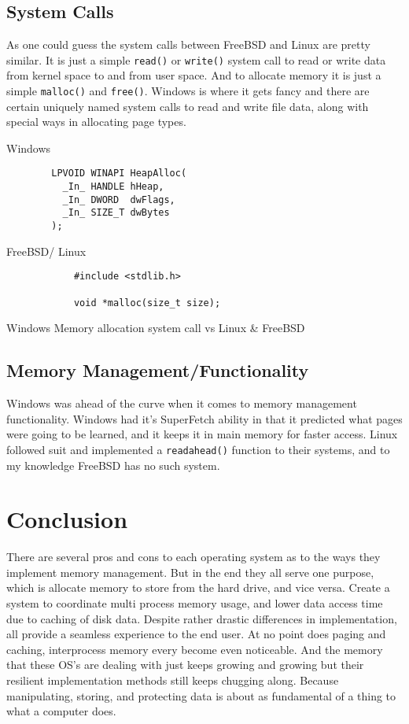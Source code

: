\documentclass{article}
\begin{document}
\subsection{System Calls}

		As one could guess the system calls between FreeBSD and Linux are pretty similar. It is just a simple \texttt{read()} or \texttt{write()} system call to read or write data from kernel space to and from user space. And to allocate memory it is just a simple \texttt{malloc()} and \texttt{free()}. Windows is where it gets fancy and there are certain uniquely named system calls to read and write file data, along with special ways in allocating page types.

		Windows
		\begin{lstlisting}
		LPVOID WINAPI HeapAlloc(
          _In_ HANDLE hHeap,
          _In_ DWORD  dwFlags,
          _In_ SIZE_T dwBytes
        );
		\end{lstlisting}
		 FreeBSD/ Linux
		\begin{lstlisting}
            #include <stdlib.h>

            void *malloc(size_t size);
        \end{lstlisting}

        Windows Memory allocation system call vs Linux \& FreeBSD
\subsection{Memory Management/Functionality}
		Windows was ahead of the curve when it comes to memory management functionality. Windows had it’s SuperFetch ability in that it predicted what pages were going to be learned, and it keeps it in main memory for faster access. Linux followed suit and implemented a \texttt{readahead()} function to their systems, and to my knowledge FreeBSD has no such system.

\section{Conclusion}
	There are several pros and cons to each operating system as to the ways they implement memory management. But in the end they all serve one purpose, which is allocate memory to store from the hard drive, and vice versa. Create a system to coordinate multi process memory usage, and lower data access time due to caching of disk data. Despite rather drastic differences in implementation, all provide a seamless experience to the end user. At no point does paging and caching, interprocess memory every become even noticeable. And the memory that these OS’s are dealing with just keeps growing and growing but their resilient implementation methods still keeps chugging along. Because manipulating, storing, and protecting data is about as fundamental of a thing to what a computer does.
\end{document}
